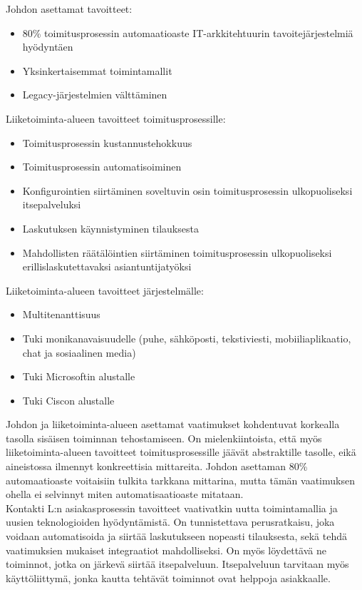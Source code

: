 \documentclass[finnish,12pt,a4paper,pdftex]{article}
\begin{document}
\noindent Johdon asettamat tavoitteet:
\begin{itemize}
    \item 80\% toimitusprosessin automaatioaste IT-arkkitehtuurin tavoitejärjestelmiä hyödyntäen
    \item Yksinkertaisemmat toimintamallit
    \item Legacy-järjestelmien välttäminen
\end{itemize}
Liiketoiminta-alueen tavoitteet toimitusprosessille:
\begin{itemize}
    \item Toimitusprosessin kustannustehokkuus
    \item Toimitusprosessin automatisoiminen
    \item Konfigurointien siirtäminen soveltuvin osin toimitusprosessin ulkopuoliseksi itsepalveluksi
    \item Laskutuksen käynnistyminen tilauksesta
    \item Mahdollisten räätälöintien siirtäminen toimitusprosessin ulkopuoliseksi erillislaskutettavaksi asiantuntijatyöksi
\end{itemize}
Liiketoiminta-alueen tavoitteet järjestelmälle:
\begin{itemize}
    \item Multitenanttisuus
    \item Tuki monikanavaisuudelle (puhe, sähköposti, tekstiviesti, mobiiliaplikaatio, chat ja sosiaalinen media)
    \item Tuki Microsoftin alustalle
    \item Tuki Ciscon alustalle
\end{itemize}

\noindent Johdon ja liiketoiminta-alueen asettamat vaatimukset kohdentuvat korkealla tasolla sisäisen toiminnan tehostamiseen. On mielenkiintoista, että myös liiketoiminta-alueen tavoitteet toimitusprosessille jäävät abstraktille tasolle, eikä aineistossa ilmennyt konkreettisia mittareita. Johdon asettaman 80\% automaatioaste voitaisiin tulkita tarkkana mittarina, mutta tämän vaatimuksen ohella ei selvinnyt miten automatisaatioaste mitataan.\\


Kontakti L:n asiakasprosessin tavoitteet vaativatkin uutta toimintamallia ja uusien teknologioiden hyödyntämistä. On tunnistettava perusratkaisu, joka voidaan automatisoida ja siirtää laskutukseen nopeasti tilauksesta, sekä tehdä vaatimuksien mukaiset integraatiot mahdolliseksi. On myös löydettävä ne toiminnot, jotka on järkevä siirtää itsepalveluun. Itsepalveluun tarvitaan myös käyttöliittymä, jonka kautta tehtävät toiminnot ovat helppoja asiakkaalle.\\
\end{document}
